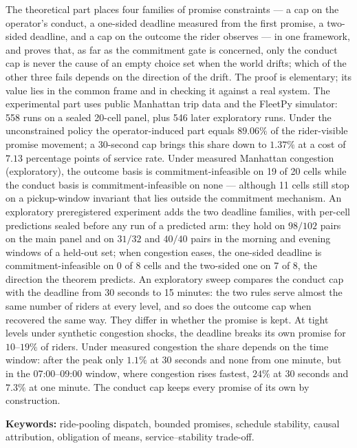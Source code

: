 The theoretical part places four families of promise constraints --- a cap on the operator's
conduct, a one-sided deadline measured from the first promise, a two-sided deadline, and a cap
on the outcome the rider observes --- in one framework, and proves that, as far as the
commitment gate is concerned, only the conduct cap is never the cause of an empty choice set
when the world drifts; which of the other three fails depends on the direction of the drift.
The proof is elementary; its value lies in the common frame and in checking it against a real
system. The experimental part uses public Manhattan trip data and the FleetPy simulator: 558
runs on a sealed 20-cell panel, plus 546 later exploratory runs. Under the unconstrained policy the
operator-induced part equals $89.06\%$ of the rider-visible promise movement; a 30-second cap
brings this share down to $1.37\%$ at a cost of $7.13$ percentage points of service rate. Under
measured Manhattan congestion (exploratory), the outcome basis is commitment-infeasible on 19
of 20 cells while the conduct basis is commitment-infeasible on none --- although 11 cells still
stop on a pickup-window invariant that lies outside the commitment mechanism. An exploratory
preregistered experiment adds the two deadline families, with per-cell predictions sealed before
any run of a predicted arm: they hold on $98/102$ pairs on the main panel and on $31/32$ and $40/40$ pairs in the
morning and evening windows of a held-out set; when congestion eases, the one-sided deadline is
commitment-infeasible on 0 of 8 cells and the two-sided one on 7 of 8, the direction the theorem
predicts. An exploratory sweep compares the conduct cap with the deadline from 30 seconds to 15
minutes: the two rules serve almost the same number of riders at every level, and so does the outcome
cap when recovered the same way. They differ in whether the promise is kept. At tight levels under
synthetic congestion shocks, the deadline breaks its own promise for $10$--$19\%$ of riders. Under
measured congestion the share depends on the time window: after the peak only $1.1\%$ at 30 seconds and
none from one minute, but in the 07:00--09:00 window, where congestion rises fastest, $24\%$ at 30 seconds
and $7.3\%$ at one minute. The conduct cap keeps every promise of its own by construction.

\vspace{6pt}
\noindent\textbf{Keywords:} ride-pooling dispatch, bounded promises, schedule stability, causal
attribution, obligation of means, service--stability trade-off.

\clearpage
